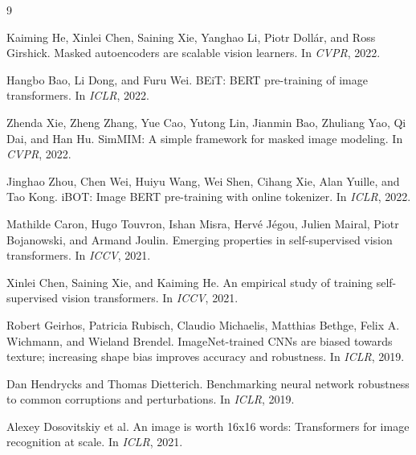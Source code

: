 \documentclass[10pt,twocolumn,letterpaper]{article}
\begin{document}
\begin{thebibliography}{9}

Kaiming He, Xinlei Chen, Saining Xie, Yanghao Li, Piotr Doll\'ar, and Ross Girshick.
\newblock Masked autoencoders are scalable vision learners.
\newblock In \emph{CVPR}, 2022.

Hangbo Bao, Li Dong, and Furu Wei.
\newblock BEiT: BERT pre-training of image transformers.
\newblock In \emph{ICLR}, 2022.

Zhenda Xie, Zheng Zhang, Yue Cao, Yutong Lin, Jianmin Bao, Zhuliang Yao, Qi Dai, and Han Hu.
\newblock SimMIM: A simple framework for masked image modeling.
\newblock In \emph{CVPR}, 2022.

Jinghao Zhou, Chen Wei, Huiyu Wang, Wei Shen, Cihang Xie, Alan Yuille, and Tao Kong.
\newblock iBOT: Image BERT pre-training with online tokenizer.
\newblock In \emph{ICLR}, 2022.

Mathilde Caron, Hugo Touvron, Ishan Misra, Herv\'e J\'egou, Julien Mairal, Piotr Bojanowski, and Armand Joulin.
\newblock Emerging properties in self-supervised vision transformers.
\newblock In \emph{ICCV}, 2021.

Xinlei Chen, Saining Xie, and Kaiming He.
\newblock An empirical study of training self-supervised vision transformers.
\newblock In \emph{ICCV}, 2021.

Robert Geirhos, Patricia Rubisch, Claudio Michaelis, Matthias Bethge, Felix A. Wichmann, and Wieland Brendel.
\newblock ImageNet-trained CNNs are biased towards texture; increasing shape bias improves accuracy and robustness.
\newblock In \emph{ICLR}, 2019.

Dan Hendrycks and Thomas Dietterich.
\newblock Benchmarking neural network robustness to common corruptions and perturbations.
\newblock In \emph{ICLR}, 2019.

Alexey Dosovitskiy et al.
\newblock An image is worth 16x16 words: Transformers for image recognition at scale.
\newblock In \emph{ICLR}, 2021.

\end{thebibliography}
\end{document}

